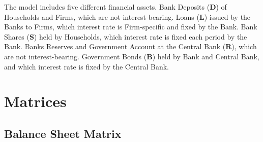 \documentclass[a4paper, headings=standardclasses]{scrartcl}
\begin{document}
The model includes five different financial assets.
Bank Deposits ($\mathbf{D}$) of Households and Firms, which are not interest-bearing.
Loans ($\mathbf{L}$) issued by the Banks to Firms, which interest rate is Firm-specific and fixed by the Bank.
Bank Shares ($\mathbf{S}$) held by Households, which interest rate is fixed each period by the Bank.
Banks Reserves and Government Account at the Central Bank ($\mathbf{R}$), which are not interest-bearing.
Government Bonds ($\mathbf{B}$) held by Bank and Central Bank, and which interest rate is fixed by the Central Bank.

\section{Matrices}
\subsection{Balance Sheet Matrix}
\end{document}
